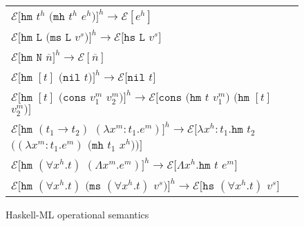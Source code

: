 \begin{figure}[p]
\centering
\begin{tabular}{l}

$\mathscr{E}[\mathtt{hm}$ $t^h$ $(\mathtt{mh}$ $t^h$ $e^h)]^h\rightarrow\mathscr{E}[e^h]$ \\

$\mathscr{E}[\mathtt{hm}$ $\mathtt{L}$ $(\mathtt{ms}$ $\mathtt{L}$ $v^s)]^h\rightarrow\mathscr{E}[\mathtt{hs}$ $\mathtt{L}$ $v^s]$ \\

$\mathscr{E}[\mathtt{hm}$ $\mathtt{N}$ $\overline{n}]^h\rightarrow\mathscr{E}[\overline{n}]$ \\

$\mathscr{E}[\mathtt{hm}$ $[t]$ $(\mathtt{nil}$ $t)]^h\rightarrow\mathscr{E}[\mathtt{nil}$ $t]$ \\

$\mathscr{E}[\mathtt{hm}$ $[t]$ $(\mathtt{cons}$ $v^m_1$ $v^m_2)]^h\rightarrow\mathscr{E}[\mathtt{cons}$ $(\mathtt{hm}$ $t$ $v^m_1)$ $(\mathtt{hm}$ $[t]$ $v^m_2)]$ \\

$\mathscr{E}[\mathtt{hm}$ $(t_1\rightarrow t_2)$ $(\lambda x^m:t_1.e^m)]^h\rightarrow\mathscr{E}[\lambda x^h:t_1.\mathtt{hm}$ $t_2$ $((\lambda x^m:t_1.e^m)$ $(\mathtt{mh}$ $t_1$ $x^h))]$ \\

$\mathscr{E}[\mathtt{hm}$ $(\forall x^h.t)$ $(\Lambda x^m.e^m)]^h\rightarrow\mathscr{E}[\Lambda x^h.\mathtt{hm}$ $t$ $e^m]$ \\

$\mathscr{E}[\mathtt{hm}$ $(\forall x^h.t)$ $(\mathtt{ms}$ $(\forall x^h.t)$ $v^s)]^h\rightarrow\mathscr{E}[\mathtt{hs}$ $(\forall x^h.t)$ $v^s]$ \\

\end{tabular}
\caption{Haskell-ML operational semantics}
\label{hmos}
\end{figure}